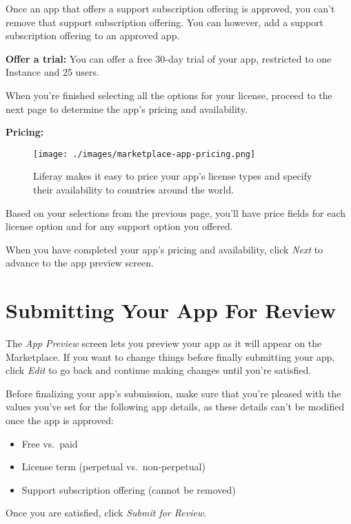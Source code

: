 Once an app that offers a support subscription offering is approved, you
can't remove that support subscription offering. You can however, add a
support subscription offering to an approved app.

\textbf{Offer a trial:} You can offer a free 30-day trial of your app,
restricted to one Instance and 25 users.

When you're finished selecting all the options for your license, proceed
to the next page to determine the app's pricing and availability.

\textbf{Pricing:}

\begin{figure}
\centering
\texttt{[image: ./images/marketplace-app-pricing.png]}
\caption{Liferay makes it easy to price your app's license types and
specify their availability to countries around the world.}
\end{figure}

Based on your selections from the previous page, you'll have price
fields for each license option and for any support option you offered.

When you have completed your app's pricing and availability, click
\emph{Next} to advance to the app preview screen.

\section{Submitting Your App For
Review}\label{submitting-your-app-for-review}

The \emph{App Preview} screen lets you preview your app as it will
appear on the Marketplace. If you want to change things before finally
submitting your app, click \emph{Edit} to go back and continue making
changes until you're satisfied.

Before finalizing your app's submission, make sure that you're pleased
with the values you've set for the following app details, as these
details can't be modified once the app is approved:

\begin{itemize}
\tightlist
\item
  Free vs.~paid
\item
  License term (perpetual vs.~non-perpetual)
\item
  Support subscription offering (cannot be removed)
\end{itemize}

Once you are satisfied, click \emph{Submit for Review}.

